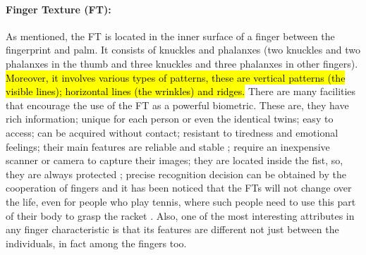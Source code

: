 \documentclass[review]{elsarticle}
\begin{document}
	\paragraph{\textbf{Finger Texture (FT):}} As mentioned, the FT is located in the inner surface of a finger between the fingerprint and palm. It consists of knuckles and phalanxes (two knuckles and two phalanxes in the thumb and three knuckles and three phalanxes in other fingers). \hl{Moreover, it involves various types of patterns, these are vertical patterns (the visible lines); horizontal lines (the wrinkles) and ridges.} There are many facilities that encourage the use of the FT as a powerful biometric. These are, they have rich information; unique for each person or even the identical twins; easy to access; can be acquired without contact; resistant to tiredness and emotional feelings; their main features are reliable and stable \cite{Bhaskar2014Hand}; require an inexpensive scanner or camera to capture their images; they are located inside the fist, so, they are always protected \cite{Michael2010Robust}; precise recognition decision can be obtained by the cooperation of fingers and it has been noticed that the FTs will not change over the life, even for people who play tennis, where such people need to use this part of their body to grasp the racket \cite{Ribaric2005ABiometric}. Also, one of the most interesting attributes in any finger characteristic is that its features are different not just between the individuals, in fact among the fingers too.  
	\begin{table}[h]
		\centering
		\caption{Comparisons between the various finger physiological characteristics as it can be investigated from \cite{garg2012biometric,kulkarni2012secure,garg2013unified,Multimodal2013Ravi,jaswal2016knuckle,Al-Nima2017Signal,Al-Nima2017finger,dev2017review,Sadik2017Asurvey}}
		\label{Table:finger_characteristics_levels}
	\end{table}
\end{document}
